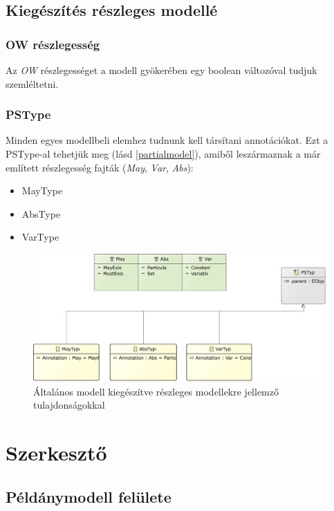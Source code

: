 \subsection{Kiegészítés részleges modellé}

\subsubsection{OW részlegesség}
Az \textit{OW} részlegességet a modell gyökerében egy boolean változóval tudjuk szemléltetni.

\subsubsection{PSType}
Minden egyes modellbeli elemhez tudnunk kell társítani annotációkat. Ezt a PSType-al tehetjük meg (lásd \autoref{partialmodel}), amiből leszármaznak a már említett részlegesség fajták (\textit{May}, \textit{Var}, \textit{Abs}):

\begin{itemize}  
	\item MayType
	\item AbsType
	\item VarType 
\end{itemize}

\begin{figure}[!ht]
	\centering
	\includegraphics[width=150mm]{figures/partialmodel02.pdf}
	\caption{Általános modell kiegészítve részleges modellekre jellemző tulajdonságokkal}
	\label{partialmodel} 
\end{figure}

\section{Szerkesztő}
\subsection{Példánymodell felülete}
